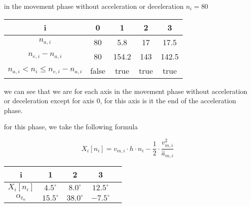 \documentclass[%
  professionalfonts,%
  xcolor={%
    usenames,%
    dvipsnames,%
    svgnames,%
    table,%
    hyperref%
  }%
]{beamer}
\begin{document}
\begin{frame}
in the movement phase without acceleration or deceleration $n_i = 80$

\begin{center}
\begin{tabular}{ccccc}
\toprule
i & 0 & 1 & 2 & 3 \\
\midrule
$n_{a,i}$ & 80 & 5.8 & 17 & 17.5 \\ 
$ n_{e,i} - n_{a,i}$ & 80 & 154.2 & 143 & 142.5 \\
$ n_{a,i} < n_{i} \leq n_{e,i} - n_{a,i}$ & false & true & true & true \\
\bottomrule
\end{tabular}
\end{center}

we can see that we are for each axis in the movement phase without acceleration or deceleration except for
axis 0, for this axis is it the end of the acceleration phase.

for this phase, we take the following formula

\begin{equation*}
X_{i}[n_{i}] = v_{m,i} \cdot h \cdot n_{i} - \frac{1}{2} \cdot \frac{v_{m,i}^2}{\hat{a}_{m,i}} 
\end{equation*}

\begin{center}
\begin{tabular}{ccccc}
\toprule
i & 1 & 2 & 3 \\
\midrule
$X_{i}[n_{i}]$ & $4.5^\circ$ & $8.0^\circ$ & $12.5^\circ$ \\ 
$\alpha_{t_{n}}$ & $15.5^\circ$ & $38.0^\circ$ & $-7.5^\circ$ \\
\bottomrule
\end{tabular}
\end{center}
\end{frame}
\end{document}
